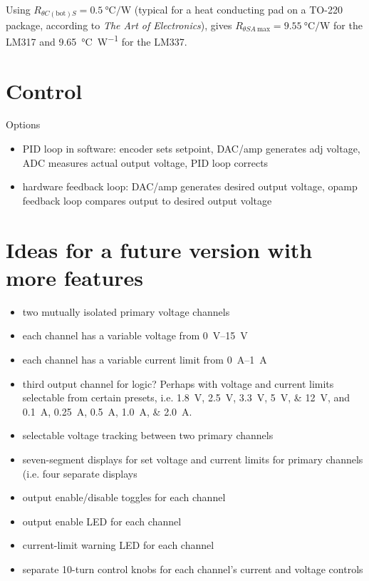 \documentclass{article}
\begin{document}
Using $R_{\theta C\mathrm{(bot)}S} = \SI{0.5}{\celsius\per\watt}$ (typical for 
a heat conducting pad on a TO-220 package, according to 
\emph{The Art of Electronics}), gives $R_{\theta SA~\mathrm{max}} =
\SI{9.55}{\celsius\per\watt}$ for the LM317 and \SI{9.65}{\celsius\per\watt} for
the LM337. 

\section{Control}
Options
\begin{itemize}
  \item{PID loop in software: encoder sets setpoint, DAC/amp generates adj
          voltage, ADC measures actual output voltage, PID loop corrects}
  \item{hardware feedback loop: DAC/amp generates desired output voltage,
          opamp feedback loop compares output to desired output voltage}
\end{itemize}

\section{Ideas for a future version with more features}
\begin{itemize}
  \item{two mutually isolated primary voltage channels}
  \item{each channel has a variable voltage from \SIrange{0}{15}{\volt}}
  \item{each channel has a variable current limit from \SIrange{0}{1}{\ampere}}
  \item{third output channel for logic? Perhaps with voltage and
      current limits selectable from certain presets, i.e.
      \SIlist{1.8;2.5;3.3;5;12}{\volt}, and
      \SIlist{0.1;0.25;0.5;1.0;2.0}{\ampere}.}
  \item{selectable voltage tracking between two primary channels}
  \item{seven-segment displays for set voltage and current limits for primary
      channels (i.e. four separate displays}
  \item{output enable/disable toggles for each channel}
  \item{output enable LED for each channel}
  \item{current-limit warning LED for each channel}
  \item{separate 10-turn control knobs for each channel's current and voltage
      controls} 
\end{itemize}
\end{document}
